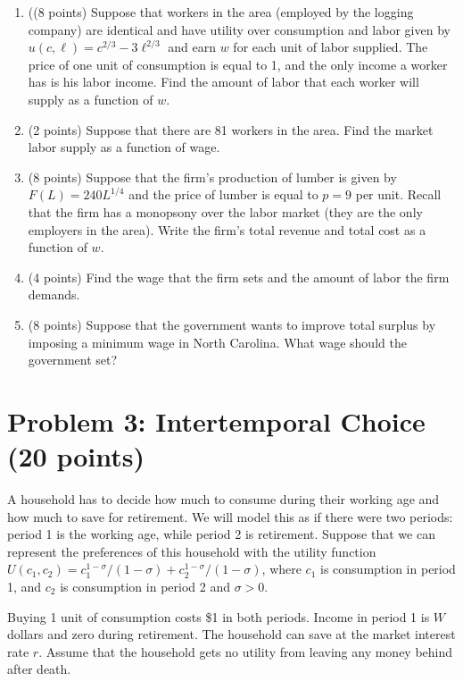 \documentclass{article}
\begin{document}
\begin{enumerate}
\item ((8 points) Suppose that workers in the area (employed by the logging company) are identical and have utility over consumption and labor given by $u(c, \ell) = c^{2/3} - 3\ell^{2/3}$ and earn $w$ for each unit of labor supplied. The price of one unit of consumption is equal to 1, and the only income a worker has is his labor income. Find the amount of labor that each worker will supply as a function of $w$.
\item (2 points) Suppose that there are 81 workers in the area. Find the market labor supply as a function of wage.
\item (8 points) Suppose that the ﬁrm’s production of lumber is given by $F(L) = 240L^{1/4}$ and the price of lumber is equal to $p = 9$ per unit. Recall that the ﬁrm has a monopsony over the labor market (they are the only employers in the area). Write the ﬁrm’s total revenue and total cost as a function of $w$.
\item (4 points) Find the wage that the ﬁrm sets and the amount of labor the ﬁrm demands.
\item (8 points) Suppose that the government wants to improve total surplus by imposing a minimum wage in North Carolina. What wage should the government set?
\end{enumerate}

\section*{Problem 3: Intertemporal Choice (20 points)}

A household has to decide how much to consume during their working age and how much to save for retirement. We will model this as if there were two periods: period 1 is the working age, while period 2 is retirement. Suppose that we can represent the preferences of this household with the utility function $U(c_1, c_2) = c_1^{1-\sigma}/(1-\sigma) + c_2^{1-\sigma}/(1-\sigma)$, where $c_1$ is consumption in period 1, and $c_2$ is consumption in period 2 and $\sigma > 0$.

Buying 1 unit of consumption costs \$1 in both periods. Income in period 1 is $W$ dollars and zero during retirement. The household can save at the market interest rate $r$. Assume that the household gets no utility from leaving any money behind after death.
\end{document}
